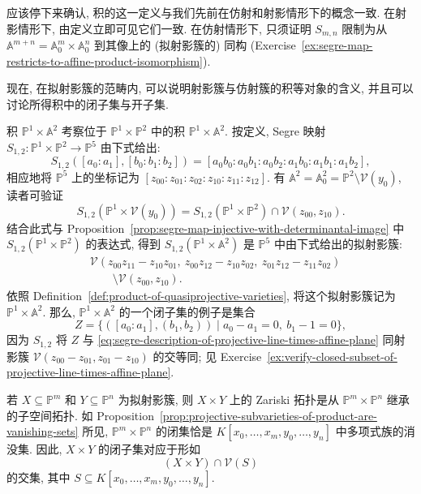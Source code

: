 应该停下来确认, 积的这一定义与我们先前在仿射和射影情形下的概念一致. 在射影情形下, 由定义立即可见它们一致. 在仿射情形下, 只须证明 $S_{m,n}$ 限制为从 $\mathbb{A}^{m+n}=\mathbb{A}^{m}_{0}\times\mathbb{A}^{n}_{0}$ 到其像上的 (拟射影簇的) 同构 (Exercise~\ref{ex:segre-map-restricts-to-affine-product-isomorphism}).

现在, 在拟射影簇的范畴内, 可以说明射影簇与仿射簇的积等对象的含义, 并且可以讨论所得积中的闭子集与开子集.

\begin{Example}{积 $\mathbb{P}^{1}\times\mathbb{A}^{2}$}\leavevmode\label{ex:product-of-projective-line-and-affine-plane}
考察位于 $\mathbb{P}^{1}\times\mathbb{P}^{2}$ 中的积 $\mathbb{P}^{1}\times\mathbb{A}^{2}$. 按定义, Segre 映射 $S_{1,2}:\mathbb{P}^{1}\times\mathbb{P}^{2}\to\mathbb{P}^{5}$ 由下式给出:
\[
  S_{1,2}([a_{0}:a_{1}],[b_{0}:b_{1}:b_{2}])
  =[a_{0}b_{0}:a_{0}b_{1}:a_{0}b_{2}:a_{1}b_{0}:a_{1}b_{1}:a_{1}b_{2}],
\]
相应地将 $\mathbb{P}^{5}$ 上的坐标记为 $[z_{00}:z_{01}:z_{02}:z_{10}:z_{11}:z_{12}]$. 有 $\mathbb{A}^{2}=\mathbb{A}^{2}_{0}=\mathbb{P}^{2}\setminus\mathcal{V}(y_{0})$, 读者可验证
\[
  S_{1,2}(\mathbb{P}^{1}\times\mathcal{V}(y_{0}))
    =S_{1,2}(\mathbb{P}^{1}\times\mathbb{P}^{2})\cap\mathcal{V}(z_{00},z_{10}).
\]
结合此式与 Proposition~\ref{prop:segre-map-injective-with-determinantal-image} 中 $S_{1,2}(\mathbb{P}^{1}\times\mathbb{P}^{2})$ 的表达式, 得到 $S_{1,2}(\mathbb{P}^{1}\times\mathbb{A}^{2})$ 是 $\mathbb{P}^{5}$ 中由下式给出的拟射影簇:
\begin{equation}\label{eq:segre-description-of-projective-line-times-affine-plane}
  \begin{aligned}
  &\mathcal{V}(z_{00}z_{11}-z_{10}z_{01},\ 
      z_{00}z_{12}-z_{10}z_{02},\ z_{01}z_{12}-z_{11}z_{02})\\
  &\qquad{}\setminus\mathcal{V}(z_{00},z_{10}).
  \end{aligned}
\end{equation}
依照 Definition~\ref{def:product-of-quasiprojective-varieties}, 将这个拟射影簇记为 $\mathbb{P}^{1}\times\mathbb{A}^{2}$. 那么, $\mathbb{P}^{1}\times\mathbb{A}^{2}$ 的一个闭子集的例子是集合
\[
  Z=\{([a_{0}:a_{1}],(b_{1},b_{2}))\mid a_{0}-a_{1}=0,\ b_{1}-1=0\},
\]
因为 $S_{1,2}$ 将 $Z$ 与 \eqref{eq:segre-description-of-projective-line-times-affine-plane} 同射影簇 $\mathcal{V}(z_{00}-z_{01},z_{01}-z_{10})$ 的交等同; 见 Exercise~\ref{ex:verify-closed-subset-of-projective-line-times-affine-plane}.
\end{Example}

若 $X\subseteq\mathbb{P}^{m}$ 和 $Y\subseteq\mathbb{P}^{n}$ 为拟射影簇, 则 $X\times Y$ 上的 Zariski 拓扑是从 $\mathbb{P}^{m}\times\mathbb{P}^{n}$ 继承的子空间拓扑. 如 Proposition~\ref{prop:projective-subvarieties-of-product-are-vanishing-sets} 所见, $\mathbb{P}^{m}\times\mathbb{P}^{n}$ 的闭集恰是 $K[x_{0},\ldots,x_{m},y_{0},\ldots,y_{n}]$ 中多项式族的消没集. 因此, $X\times Y$ 的闭子集对应于形如
\[
  (X\times Y)\cap\mathcal{V}(S)
\]
的交集, 其中 $S\subseteq K[x_{0},\ldots,x_{m},y_{0},\ldots,y_{n}]$.

